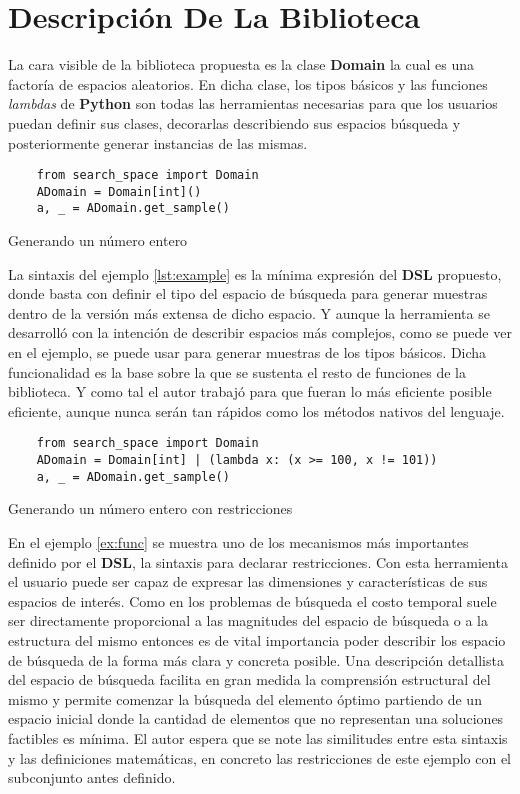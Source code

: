 \section{Descripción De La Biblioteca}

La cara visible de la biblioteca propuesta es la clase {\bf Domain} la cual es una factoría de espacios
aleatorios. En dicha clase, los tipos básicos y las funciones {\it lambdas} de {\bf Python} son todas
las herramientas necesarias para que los usuarios puedan definir sus clases, decorarlas describiendo
sus espacios búsqueda y posteriormente generar instancias de las mismas.


\begin{listing}[!ht]
    \begin{verbatim}
    from search_space import Domain
    ADomain = Domain[int]()
    a, _ = ADomain.get_sample()
    \end{verbatim}
    \caption{Generando un número entero}
    \label{lst:example}
\end{listing}

La sintaxis del ejemplo \ref{lst:example} es la mínima expresión del {\bf DSL} propuesto, donde basta con
definir el tipo del espacio de búsqueda para generar muestras dentro de la versión más extensa de dicho
espacio. Y aunque la herramienta se desarrolló con la intención de describir espacios más complejos,
como se puede ver en el ejemplo, se puede usar para generar muestras de los tipos básicos. Dicha
funcionalidad es la base sobre la que se sustenta el resto de funciones de la biblioteca.
Y como tal el autor trabajó para que fueran lo más eficiente posible eficiente, aunque nunca serán
tan rápidos como los métodos nativos del lenguaje.

\begin{listing}[!ht]
    \begin{verbatim}
    from search_space import Domain
    ADomain = Domain[int] | (lambda x: (x >= 100, x != 101))
    a, _ = ADomain.get_sample()
    \end{verbatim}
    \caption{Generando un número entero con restricciones}
    \label{ex:func}
\end{listing}


En el ejemplo \ref{ex:func} se muestra uno de los mecanismos más importantes definido por el
    {\bf DSL}, la sintaxis para declarar restricciones. Con esta herramienta el usuario puede ser capaz de
expresar las dimensiones y características de sus espacios de interés. Como en los problemas de búsqueda el
costo temporal suele ser directamente proporcional a las magnitudes del espacio de búsqueda o a la estructura
del mismo entonces es de vital importancia poder describir los espacio de búsqueda de la forma más clara y
concreta posible. Una descripción detallista del espacio de búsqueda facilita en gran medida la comprensión
estructural del mismo y permite comenzar la búsqueda del elemento óptimo partiendo de un espacio inicial donde
la cantidad de elementos que no representan una soluciones factibles es mínima. El autor espera que se note las
similitudes entre esta sintaxis y las definiciones matemáticas, en concreto las restricciones de este ejemplo
con el subconjunto antes definido.


